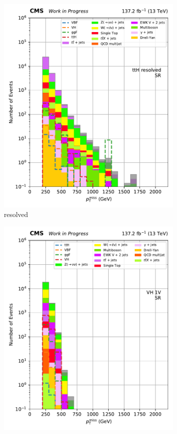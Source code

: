 \begin{figure}[htbp]
\begin{subfigure}[b]{0.24\textwidth}
        \includegraphics[width=\textwidth]{figures/region_plots/2016to18/region_0/ttH_resolved.pdf}
        \caption{\ttH resolved}
    \end{subfigure}
    \begin{subfigure}[b]{0.24\textwidth}
        \includegraphics[width=\textwidth]{figures/region_plots/2016to18/region_0/VH_1V.pdf}

\end{subfigure}
\end{figure}
